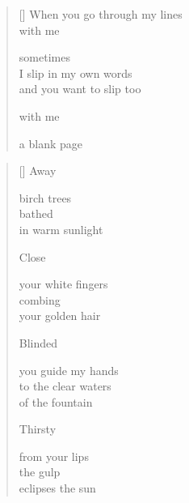 \documentclass[12pt,a4paper]{article}
\begin{document}
\newpage

\poemtitle{}

\settowidth{\versewidth}{When you go through my lines}

\bigskip

\begin{verse}[\versewidth]
  When you go through my lines \\
  with me

  sometimes \\
  I slip in my own words \\
  and you want to slip too

  with me

  a blank page
\end{verse}


\newpage

\poemtitle{}

\settowidth{\versewidth}{to the clear waters}

\bigskip

\begin{verse}[\versewidth]
  Away

  birch trees \\
  bathed \\
  in warm sunlight

  Close

  your white fingers \\
  combing \\
  your golden hair

  Blinded

  you guide my hands \\
  to the clear waters \\
  of the fountain

  Thirsty

  from your lips \\
  the gulp \\
  eclipses the sun
\end{verse}


\newpage

\poemtitle{}

\settowidth{\versewidth}{to the halo of your blond hair}

\bigskip
\end{document}

